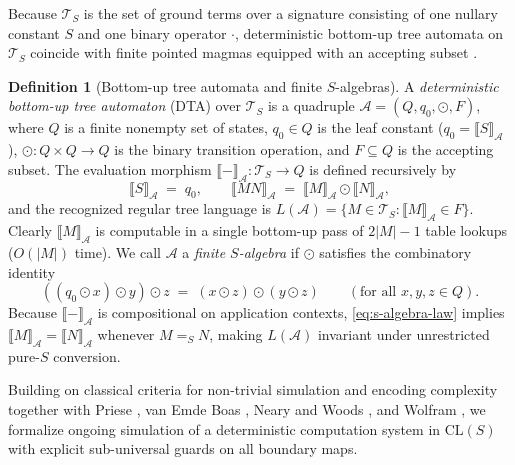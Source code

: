 \documentclass[11pt,reqno]{amsart}
\numberwithin{equation}{section}
\theoremstyle{plain}
\theoremstyle{definition}
\newtheorem{definition}[theorem]{Definition}
\theoremstyle{remark}
\newcommand{\CLS}{\mathrm{CL}(S)}
\newcommand{\TS}{\mathcal{T}_S}
\newcommand{\sem}[1]{\llbracket #1 \rrbracket}
\newcommand{\convS}{=_S}
\begin{document}
Because $\TS$ is the set of ground terms over a signature consisting of one nullary constant $S$ and one binary operator $\cdot$, deterministic bottom-up tree automata on $\TS$ coincide with finite pointed magmas equipped with an accepting subset \cite{EndrullisDeVrijerWaldmann2010,BarendregtEndrullisKlopWaldmann2017}.

\begin{definition}[Bottom-up tree automata and finite $S$-algebras]\label{def:s-algebra}
A \emph{deterministic bottom-up tree automaton} (DTA) over $\TS$ is a quadruple $\mathcal{A} = (Q, q_0, \odot, F)$, where $Q$ is a finite nonempty set of states, $q_0 \in Q$ is the leaf constant ($q_0 = \sem{S}_{\mathcal{A}}$), $\odot \colon Q \times Q \to Q$ is the binary transition operation, and $F \subseteq Q$ is the accepting subset. The evaluation morphism $\sem{-}_{\mathcal{A}} \colon \TS \to Q$ is defined recursively by
\[
  \sem{S}_{\mathcal{A}} \;=\; q_0, \qquad \sem{M N}_{\mathcal{A}} \;=\; \sem{M}_{\mathcal{A}} \odot \sem{N}_{\mathcal{A}},
\]
and the recognized regular tree language is $L(\mathcal{A}) = \{M \in \TS : \sem{M}_{\mathcal{A}} \in F\}$. Clearly $\sem{M}_{\mathcal{A}}$ is computable in a single bottom-up pass of $2|M| - 1$ table lookups ($O(|M|)$ time). We call $\mathcal{A}$ a \emph{finite $S$-algebra} if $\odot$ satisfies the combinatory identity
\begin{equation}\label{eq:s-algebra-law}
  ((q_0 \odot x) \odot y) \odot z \;=\; (x \odot z) \odot (y \odot z) \qquad (\text{for all } x, y, z \in Q).
\end{equation}
Because $\sem{-}_{\mathcal{A}}$ is compositional on application contexts, \eqref{eq:s-algebra-law} implies $\sem{M}_{\mathcal{A}} = \sem{N}_{\mathcal{A}}$ whenever $M \convS N$, making $L(\mathcal{A})$ invariant under unrestricted pure-$S$ conversion.
\end{definition}

Building on classical criteria for non-trivial simulation and encoding complexity \cite{Davis1956NoteUTM,Fischer1965Formalisms,Herman1968Simulation} together with Priese \cite{Priese1979ComplexityUTM}, van Emde Boas \cite{vanEmdeBoas1990Models}, Neary and Woods \cite{NearyWoods2006SmallFast}, and Wolfram \cite{Wolfram2021Challenge}, we formalize ongoing simulation of a deterministic computation system in $\CLS$ with explicit sub-universal guards on all boundary maps.
\end{document}
